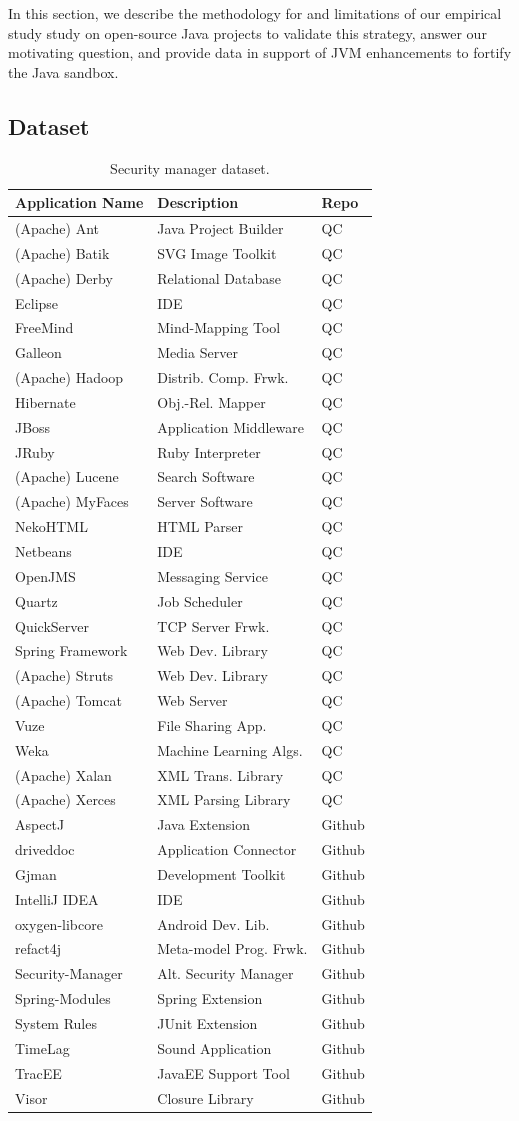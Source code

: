 \documentclass{sig-alternate}
\begin{document}
In this section, we describe the
methodology for and limitations of our empirical study
study on open-source Java projects to validate this strategy, answer our
motivating question, and provide data in support of JVM enhancements to fortify
the Java sandbox.  

\subsection{Dataset}\label{sec:Applications-Studied}

\begin{table}
\caption{Security manager dataset.\label{Table:applications-studied}}
\begin{tabular}{lll}
\toprule 
Application Name & Description & Repo\tabularnewline
\midrule
(Apache) Ant & Java Project Builder & QC\tabularnewline
(Apache) Batik & SVG Image Toolkit & QC\tabularnewline
(Apache) Derby & Relational Database & QC\tabularnewline
Eclipse  & IDE & QC\tabularnewline
FreeMind & Mind-Mapping Tool & QC\tabularnewline
Galleon & Media Server & QC\tabularnewline
(Apache) Hadoop & Distrib. Comp. Frwk. & QC\tabularnewline
Hibernate & Obj.-Rel. Mapper & QC\tabularnewline
JBoss & Application Middleware & QC\tabularnewline
JRuby & Ruby Interpreter & QC\tabularnewline
(Apache) Lucene & Search Software & QC\tabularnewline
(Apache) MyFaces & Server Software & QC\tabularnewline
NekoHTML & HTML Parser & QC\tabularnewline
Netbeans & IDE & QC\tabularnewline
OpenJMS & Messaging Service & QC\tabularnewline
Quartz  & Job Scheduler & QC\tabularnewline
QuickServer & TCP Server Frwk. & QC\tabularnewline
Spring Framework & Web Dev. Library & QC\tabularnewline
(Apache) Struts & Web Dev. Library & QC\tabularnewline
(Apache) Tomcat & Web Server & QC\tabularnewline
Vuze & File Sharing App. & QC\tabularnewline
Weka & Machine Learning Algs. & QC\tabularnewline
(Apache) Xalan & XML Trans. Library & QC\tabularnewline
(Apache) Xerces & XML Parsing Library & QC\tabularnewline
AspectJ & Java Extension & Github\tabularnewline
driveddoc & Application Connector & Github\tabularnewline
Gjman & Development Toolkit & Github\tabularnewline
IntelliJ IDEA & IDE & Github\tabularnewline
oxygen-libcore & Android Dev. Lib. & Github\tabularnewline
refact4j & Meta-model Prog. Frwk. & Github\tabularnewline
Security-Manager & Alt. Security Manager & Github\tabularnewline
Spring-Modules & Spring Extension & Github\tabularnewline
System Rules & JUnit Extension & Github\tabularnewline
TimeLag & Sound Application & Github\tabularnewline
TracEE & JavaEE Support Tool & Github\tabularnewline
Visor & Closure Library & Github\tabularnewline
\bottomrule
\end{tabular}
\end{table}
\end{document}
